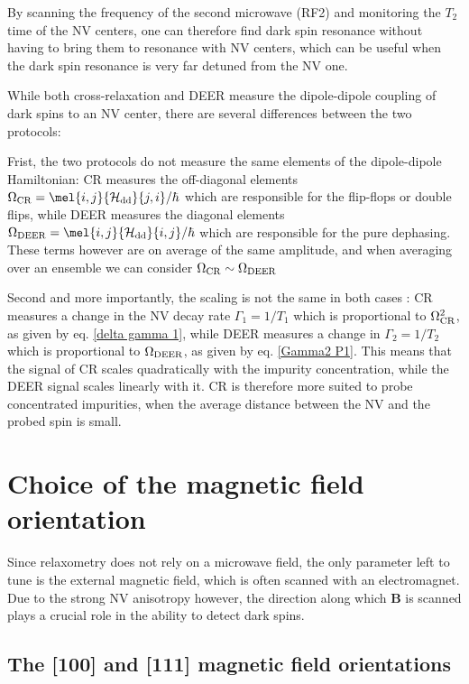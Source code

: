 \documentclass[a4paper]{report}
\begin{document}
By scanning the frequency of the second microwave (RF2) and monitoring the $T_2$ time of the NV centers, one can therefore find dark spin resonance without having to bring them to resonance with NV centers, which can be useful when the dark spin resonance is very far detuned from the NV one.

While both cross-relaxation and DEER measure the dipole-dipole coupling of dark spins to an NV center, there are several differences between the two protocols:

Frist, the two protocols do not measure the same elements of the dipole-dipole Hamiltonian: CR measures the off-diagonal elements $\Omega_{\rm CR}=\mel{i,j}{\mathcal{H}_{\rm dd}}{j,i}/\hbar$ which are responsible for the flip-flops or double flips, while DEER measures the diagonal elements $\Omega_{\rm DEER}=\mel{i,j}{\mathcal{H}_{\rm dd}}{i,j}/\hbar$ which are responsible for the pure dephasing. These terms however are on average of the same amplitude, and when averaging over an ensemble we can consider $\Omega_{\rm CR} \sim \Omega_{\rm DEER}$

Second and more importantly, the scaling is not the same in both cases : CR measures a change in the NV decay rate $\Gamma_1=1/T_1$ which is proportional to $\Omega_{\rm CR}^2$, as given by eq. \ref{delta gamma 1}, while DEER measures a change in $\Gamma_2=1/T_2$ which is proportional to $\Omega_{\rm DEER}$, as given by eq. \ref{Gamma2 P1}. This means that the signal of CR scales quadratically with the impurity concentration, while the DEER signal scales linearly with it. CR is therefore more suited to probe concentrated impurities, when the average distance between the NV and the probed spin is small.

\section{Choice of the magnetic field orientation}

Since relaxometry does not rely on a microwave field, the only parameter left to tune is the external magnetic field, which is often scanned with an electromagnet. Due to the strong NV anisotropy however, the direction along which $\mathbf{B}$ is scanned plays a crucial role in the ability to detect dark spins.

\subsection{The [100] and [111] magnetic field orientations}
\end{document}
